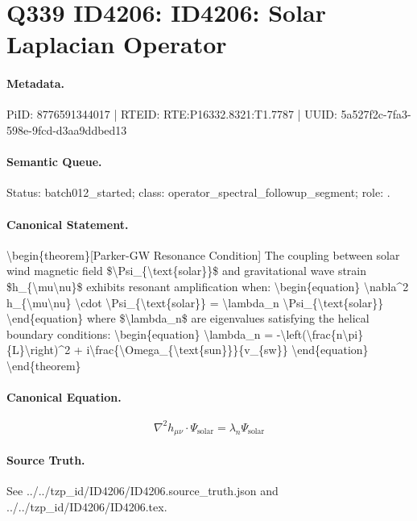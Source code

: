 \section*{Q339 ID4206: ID4206: Solar Laplacian Operator}
\paragraph{Metadata.}
PiID: 8776591344017 | RTEID: RTE:P16332.8321:T1.7787 | UUID: 5a527f2c-7fa3-598e-9fcd-d3aa9ddbed13

\paragraph{Semantic Queue.}
Status: batch012\_started; class: operator\_spectral\_followup\_segment; role: .

\paragraph{Canonical Statement.}
\textbackslash{}begin\{theorem\}[Parker-GW Resonance Condition] The coupling between solar wind magnetic field \$\textbackslash{}Psi\_\{\textbackslash{}text\{solar\}\}\$ and gravitational wave strain \$h\_\{\textbackslash{}mu\textbackslash{}nu\}\$ exhibits resonant amplification when: \textbackslash{}begin\{equation\} \textbackslash{}nabla\textasciicircum{}2 h\_\{\textbackslash{}mu\textbackslash{}nu\} \textbackslash{}cdot \textbackslash{}Psi\_\{\textbackslash{}text\{solar\}\} = \textbackslash{}lambda\_n \textbackslash{}Psi\_\{\textbackslash{}text\{solar\}\} \textbackslash{}end\{equation\} where \$\textbackslash{}lambda\_n\$ are eigenvalues satisfying the helical boundary conditions: \textbackslash{}begin\{equation\} \textbackslash{}lambda\_n = -\textbackslash{}left(\textbackslash{}frac\{n\textbackslash{}pi\}\{L\}\textbackslash{}right)\textasciicircum{}2 + i\textbackslash{}frac\{\textbackslash{}Omega\_\{\textbackslash{}text\{sun\}\}\}\{v\_\{sw\}\} \textbackslash{}end\{equation\} \textbackslash{}end\{theorem\}

\paragraph{Canonical Equation.}
\[
\begin{equation} \nabla^2 h_{\mu\nu} \cdot \Psi_{\text{solar}} = \lambda_n \Psi_{\text{solar}} \end{equation}
\]

\paragraph{Source Truth.}
See ../../tzp\_id/ID4206/ID4206.source\_truth.json and ../../tzp\_id/ID4206/ID4206.tex.
